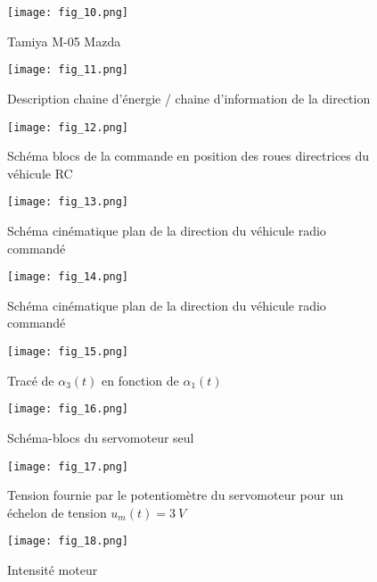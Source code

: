 \begin{figure}[H]
\centering
\texttt{[image: fig\_10.png]}
\caption{Tamiya M-05 Mazda \label{fig_10}}
\end{figure}


\begin{figure}[H]
\centering
\texttt{[image: fig\_11.png]}
\caption{Description chaine d’énergie / chaine d’information de la direction \label{fig_11}}
\end{figure}


\begin{figure}[H]
\centering
\texttt{[image: fig\_12.png]}
\caption{Schéma blocs de la commande en position des roues directrices du véhicule RC \label{fig_12}}
\end{figure}


\begin{figure}[H]
\centering
\texttt{[image: fig\_13.png]}
\caption{Schéma cinématique plan de la direction du véhicule radio commandé \label{fig_13}}
\end{figure}


\begin{figure}[H]
\centering
\texttt{[image: fig\_14.png]}
\caption{Schéma cinématique plan de la direction du véhicule radio commandé \label{fig_14}}
\end{figure}


\begin{figure}[H]
\centering
\texttt{[image: fig\_15.png]}
\caption{Tracé de $\alpha_3(t)$ en fonction de $\alpha_1(t)$ \label{fig_15}}
\end{figure}


\begin{figure}[H]
\centering
\texttt{[image: fig\_16.png]}
\caption{Schéma-blocs du servomoteur seul \label{fig_16}}
\end{figure}


\begin{figure}[H]
\centering
\texttt{[image: fig\_17.png]}
\caption{Tension fournie par le potentiomètre du servomoteur pour un échelon de tension $u_m(t)=\SI{3}{V}$ \label{fig_17}}
\end{figure}


\begin{figure}[H]
\centering
\texttt{[image: fig\_18.png]}
\caption{ Intensité moteur\label{fig_18}}
\end{figure}


